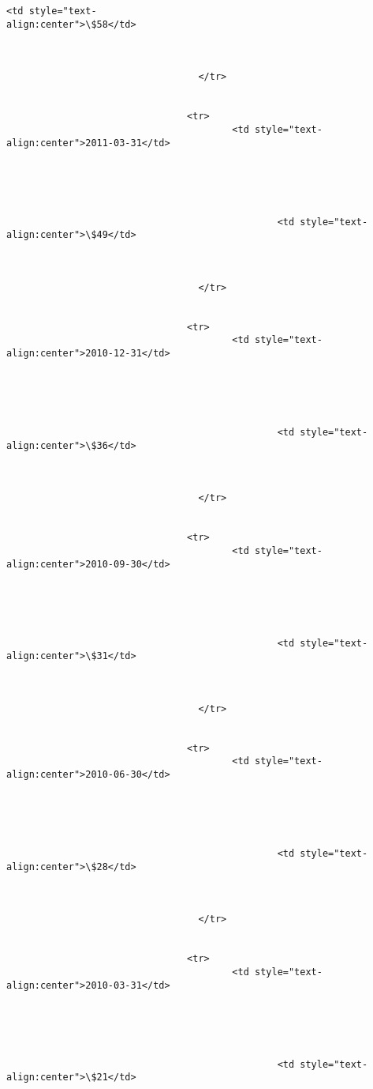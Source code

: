 \documentclass[11pt]{article}
\begin{document}
\begin{Verbatim}[commandchars=\\\{\}]
                                                <td style="text-
align:center">\$58</td>



                                  </tr>


                                <tr>
                                        <td style="text-
align:center">2011-03-31</td>





                                                <td style="text-
align:center">\$49</td>



                                  </tr>


                                <tr>
                                        <td style="text-
align:center">2010-12-31</td>





                                                <td style="text-
align:center">\$36</td>



                                  </tr>


                                <tr>
                                        <td style="text-
align:center">2010-09-30</td>





                                                <td style="text-
align:center">\$31</td>



                                  </tr>


                                <tr>
                                        <td style="text-
align:center">2010-06-30</td>





                                                <td style="text-
align:center">\$28</td>



                                  </tr>


                                <tr>
                                        <td style="text-
align:center">2010-03-31</td>





                                                <td style="text-
align:center">\$21</td>




\end{Verbatim}
\end{document}
